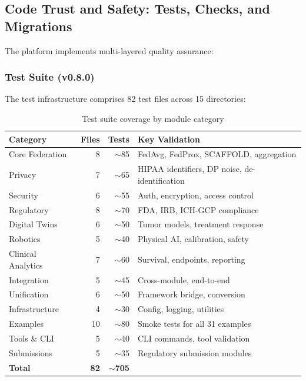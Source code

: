 \subsection{Code Trust and Safety: Tests, Checks, and Migrations}
\label{sec:code-trust}

The platform implements multi-layered quality assurance:

\subsubsection{Test Suite (v0.8.0)}

The test infrastructure comprises 82 test files across 15 directories:

\begin{table}[H]
\centering
\caption{Test suite coverage by module category}
\label{tab:tests}
\small
\begin{tabular}{@{}lrrl@{}}
\toprule
\textbf{Category} & \textbf{Files} & \textbf{Tests} & \textbf{Key Validation} \\
\midrule
Core Federation & 8 & $\sim$85 & FedAvg, FedProx, SCAFFOLD, aggregation \\
Privacy & 7 & $\sim$65 & HIPAA identifiers, DP noise, de-identification \\
Security & 6 & $\sim$55 & Auth, encryption, access control \\
Regulatory & 8 & $\sim$70 & FDA, IRB, ICH-GCP compliance \\
Digital Twins & 6 & $\sim$50 & Tumor models, treatment response \\
Robotics & 5 & $\sim$40 & Physical AI, calibration, safety \\
Clinical Analytics & 7 & $\sim$60 & Survival, endpoints, reporting \\
Integration & 5 & $\sim$45 & Cross-module, end-to-end \\
Unification & 6 & $\sim$50 & Framework bridge, conversion \\
Infrastructure & 4 & $\sim$30 & Config, logging, utilities \\
Examples & 10 & $\sim$80 & Smoke tests for all 31 examples \\
Tools \& CLI & 5 & $\sim$40 & CLI commands, tool validation \\
Submissions & 5 & $\sim$35 & Regulatory submission modules \\
\midrule
\textbf{Total} & \textbf{82} & $\sim$\textbf{705} & \\
\bottomrule
\end{tabular}
\end{table}


